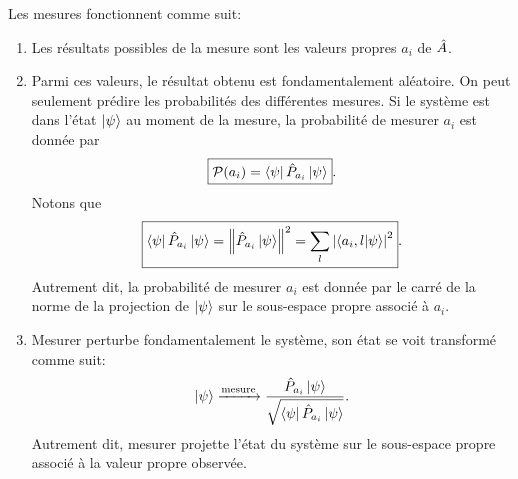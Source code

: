 \documentclass[11pt,a4paper,oneside]{article}
\begin{document}
Les mesures fonctionnent comme suit:
\begin{enumerate}
    \item Les résultats possibles de la mesure sont les valeurs propres $a_i$ de $\hat{A}$.
    \item Parmi ces valeurs, le résultat obtenu est fondamentalement aléatoire. On peut seulement prédire les probabilités des différentes mesures. Si le système est dans l'état $\ket{\psi_{}}$ au moment de la mesure, la probabilité de mesurer $a_i$ est donnée par
    \begin{equation}
        \boxed{\mathcal{P}(a_i) = \bra{\psi}\hat{P}_{a_i}\ket{\psi_{}}}.\label{eq:probames}
    \end{equation}
    Notons que 
    \begin{equation}
        \boxed{\bra{\psi}\hat{P}_{a_i}\ket{\psi_{}}=\norm{\hat{P}_{a_i}\ket{\psi_{}}}^2 = \sum_l \abs{\braket{a_i,l}{\psi}}^2}.\label{eq:probames2}
    \end{equation}
    Autrement dit, la probabilité de mesurer $a_i$ est donnée par le carré de la norme de la projection de $\ket{\psi_{}}$ sur le sous-espace propre associé à $a_i$.
    \item Mesurer perturbe fondamentalement le système, son état se voit transformé comme suit:
    \begin{equation}
        \ket{\psi_{}} \xrightarrow[]{\text{mesure}} \frac{\hat{P}_{a_i}\ket{\psi_{}}}{\sqrt{\bra{\psi}\hat{P}_{a_i}\ket{\psi}}}.
    \end{equation}
    Autrement dit, mesurer projette l'état du système sur le sous-espace propre associé à la valeur propre observée.
\end{enumerate}
\end{document}
